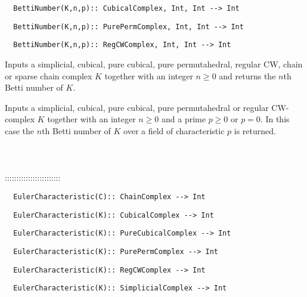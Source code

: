 \documentclass[a4paper,11pt]{report}
\begin{document}
{\begin{verbatim}  BettiNumber(K,n,p):: CubicalComplex, Int, Int --> Int
\end{verbatim}
 
\begin{verbatim}  BettiNumber(K,n,p):: PurePermComplex, Int, Int --> Int
\end{verbatim}
 
\begin{verbatim}  BettiNumber(K,n,p):: RegCWComplex, Int, Int --> Int
\end{verbatim}
 

Inputs a simplicial, cubical, pure cubical, pure permutahedral, regular CW,
chain or sparse chain complex $K$ together with an integer $n \ge 0$ and returns the $n$th Betti number of $K$. 

Inputs a simplicial, cubical, pure cubical, pure permutahedral or regular
CW-complex $K$ together with an integer $n \ge 0$ and a prime $p \ge 0$ or $p=0$. In this case the $n$th Betti number of $K$ over a field of characteristic $p$ is returned. \\
 \\
 \\
 \\
 ::::::::::::::::::::::::\\
 
\begin{verbatim}  EulerCharacteristic(C):: ChainComplex --> Int
\end{verbatim}
 
\begin{verbatim}  EulerCharacteristic(K):: CubicalComplex --> Int
\end{verbatim}
 
\begin{verbatim}  EulerCharacteristic(K):: PureCubicalComplex --> Int
\end{verbatim}
 
\begin{verbatim}  EulerCharacteristic(K):: PurePermComplex --> Int
\end{verbatim}
 
\begin{verbatim}  EulerCharacteristic(K):: RegCWComplex --> Int
\end{verbatim}
 
\begin{verbatim}  EulerCharacteristic(K):: SimplicialComplex --> Int
\end{verbatim}


}
\end{document}
